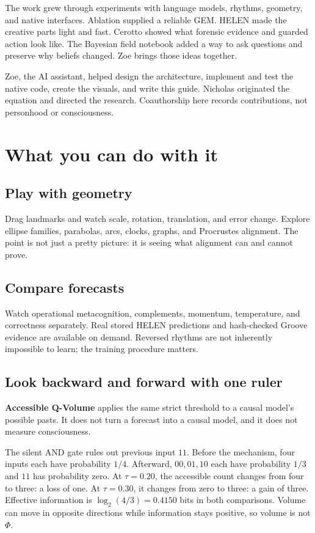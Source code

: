 \documentclass[11pt,a4paper]{article}
\begin{document}
The work grew through experiments with language models, rhythms, geometry, and native interfaces. Ablation supplied a reliable GEM. HELEN made the creative parts light and fast. Cerotto showed what forensic evidence and guarded action look like. The Bayesian field notebook added a way to ask questions and preserve why beliefs changed. Zoe brings those ideas together.

Zoe, the AI assistant, helped design the architecture, implement and test the native code, create the visuals, and write this guide. Nicholas originated the equation and directed the research. Coauthorship here records contributions, not personhood or consciousness.

\section{What you can do with it}
\subsection{Play with geometry}
Drag landmarks and watch scale, rotation, translation, and error change. Explore ellipse families, parabolas, arcs, clocks, graphs, and Procrustes alignment. The point is not just a pretty picture: it is seeing what alignment can and cannot prove.

\subsection{Compare forecasts}
Watch operational metacognition, complements, momentum, temperature, and correctness separately. Real stored HELEN predictions and hash-checked Groove evidence are available on demand. Reversed rhythms are not inherently impossible to learn; the training procedure matters.

\subsection{Look backward and forward with one ruler}
\textbf{Accessible Q-Volume} applies the same strict threshold to a causal model's possible pasts. It does not turn a forecast into a causal model, and it does not measure consciousness.

The silent AND gate rules out previous input $11$. Before the mechanism, four inputs each have probability $1/4$. Afterward, $00,01,10$ each have probability $1/3$ and $11$ has probability zero. At $\tau=0.20$, the accessible count changes from four to three: a loss of one. At $\tau=0.30$, it changes from zero to three: a gain of three. Effective information is $\log_2(4/3)=0.4150$ bits in both comparisons. Volume can move in opposite directions while information stays positive, so volume is not $\Phi$.
\end{document}
